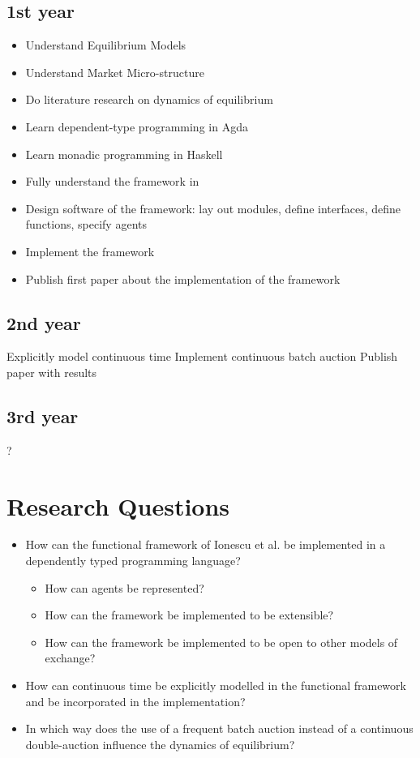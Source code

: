 \documentclass{article}
\begin{document}
\subsection{1st year}

\begin{itemize}
\item Understand Equilibrium Models
\item Understand Market Micro-structure
\item Do literature research on dynamics of equilibrium 
\item Learn dependent-type programming in Agda
\item Learn monadic programming in Haskell
\item Fully understand the framework in \cite{Botta20114025}
\item Design software of the framework: lay out modules, define interfaces, define functions, specify agents
\item Implement the framework
\item Publish first paper about the implementation of the framework
\end{itemize}

\subsection{2nd year}
Explicitly model continuous time
Implement continuous batch auction
Publish paper with results

\subsection{3rd year}
?


\section{Research Questions}
\begin{itemize}
\item How can the functional framework of Ionescu et al. be implemented in a dependently typed programming language?
	\begin{itemize}
	\item How can agents be represented?
	\item How can the framework be implemented to be extensible?
	\item How can the framework be implemented to be open to other models of exchange?
	\end{itemize}
\item How can continuous time be explicitly modelled in the functional framework and be incorporated in the implementation?
\item In which way does the use of a frequent batch auction instead of a continuous double-auction influence the dynamics of equilibrium?
\end{itemize}
\end{document}
